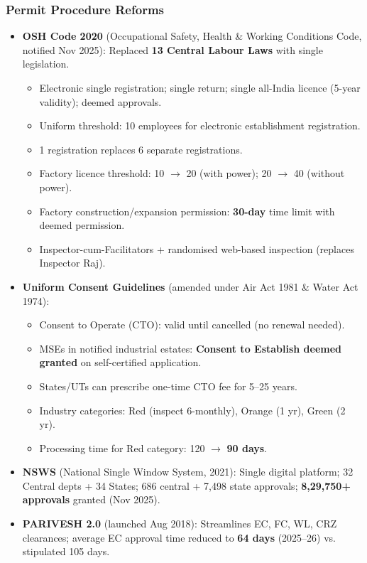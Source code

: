 \subsubsection*{Permit Procedure Reforms}
\begin{itemize}
  \item \textbf{OSH Code 2020} (Occupational Safety, Health \& Working Conditions Code, notified Nov 2025): Replaced \textbf{13 Central Labour Laws} with single legislation.
  \begin{itemize}
    \item Electronic single registration; single return; single all-India licence (5-year validity); deemed approvals.
    \item Uniform threshold: 10 employees for electronic establishment registration.
    \item 1 registration replaces 6 separate registrations.
    \item Factory licence threshold: 10 $\rightarrow$ 20 (with power); 20 $\rightarrow$ 40 (without power).
    \item Factory construction/expansion permission: \textbf{30-day} time limit with deemed permission.
    \item Inspector-cum-Facilitators + randomised web-based inspection (replaces Inspector Raj).
  \end{itemize}
  \item \textbf{Uniform Consent Guidelines} (amended under Air Act 1981 \& Water Act 1974):
  \begin{itemize}
    \item Consent to Operate (CTO): valid until cancelled (no renewal needed).
    \item MSEs in notified industrial estates: \textbf{Consent to Establish deemed granted} on self-certified application.
    \item States/UTs can prescribe one-time CTO fee for 5--25 years.
    \item Industry categories: Red (inspect 6-monthly), Orange (1 yr), Green (2 yr).
    \item Processing time for Red category: 120 $\rightarrow$ \textbf{90 days}.
  \end{itemize}
  \item \textbf{NSWS} (National Single Window System, 2021): Single digital platform; 32 Central depts + 34 States; 686 central + 7,498 state approvals; \textbf{8,29,750+ approvals} granted (Nov 2025).
  \item \textbf{PARIVESH 2.0} (launched Aug 2018): Streamlines EC, FC, WL, CRZ clearances; average EC approval time reduced to \textbf{64 days} (2025--26) vs. stipulated 105 days.
\end{itemize}


